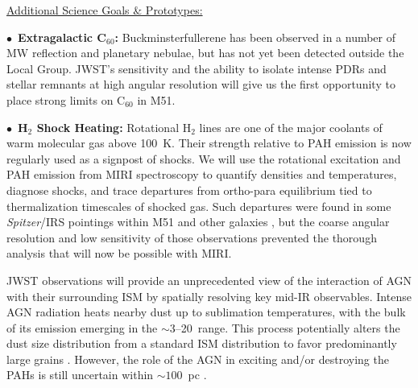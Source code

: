 \documentclass[12pt]{article}
\newenvironment{parhang}{\hangafter=1\hangindent=10pt}{\par}
\begin{document}
\vspace{0.05in}

\noindent \underline{Additional Science Goals \& Prototypes:}

    \begin{parhang}
    \noindent
     \end{parhang}
     \begin{parhang}
     \noindent
    $\bullet$~{\bf Extragalactic C$_{60}$:} Buckminsterfullerene has been observed in a number of MW reflection and planetary nebulae, but has not yet been detected outside the Local Group.  JWST's sensitivity and the ability to isolate intense PDRs and stellar remnants at high angular resolution will give us the first opportunity to place strong limits on C$_{60}$ in M51.
    \end{parhang}
    \begin{parhang}
    \noindent
    $\bullet$~{\bf H$_2$ Shock Heating:} Rotational H$_2$ lines are one of the major coolants of warm molecular gas above 100~K. 
    Their strength relative to PAH emission is now regularly used as a signpost of shocks. 
    We will use the rotational excitation and PAH emission from MIRI spectroscopy to quantify densities and temperatures, diagnose shocks, and trace departures from ortho-para equilibrium tied to thermalization timescales of shocked gas. Such departures were found in some {\em Spitzer}/IRS pointings within M51 and other galaxies  \citep{roussel2007}, but  the coarse angular resolution and low sensitivity of those observations prevented the thorough analysis that will now be possible with MIRI.
    \end{parhang}

\vspace{0.05in}

JWST observations will provide an unprecedented view of the interaction of AGN with their surrounding ISM by spatially resolving key mid-IR observables. Intense AGN radiation heats nearby dust up to sublimation temperatures, with the bulk of its emission emerging in the $\sim$3--20\micron\ range. This process potentially alters the dust size distribution from a standard ISM distribution to favor predominantly large grains  \citep[e.g.,][]{kishimoto2007,honig2017}. However, the role of the AGN in exciting and/or destroying the PAHs is still uncertain within $\sim100$~pc \citep{smith2007,jensen2017}.
\end{document}

